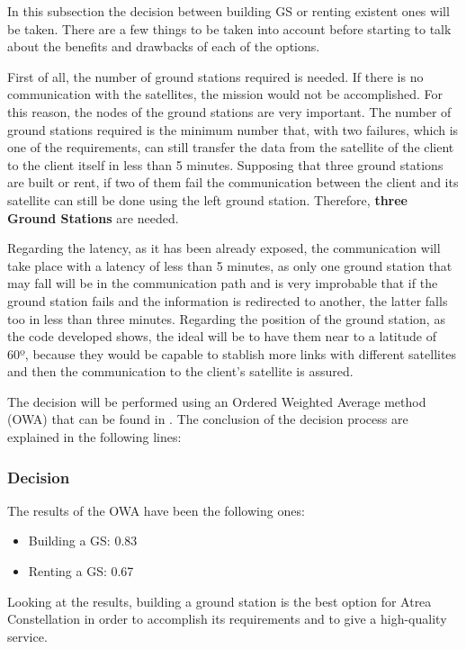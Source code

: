 In this subsection the decision between building GS or renting existent ones will be taken. There are a few things to be taken into account before starting to talk about the benefits and drawbacks of each of the options.

First of all, the number of ground stations required is needed. If there is no communication with the satellites, the mission would not be accomplished. For this reason, the nodes of the ground stations are very important. The number of ground stations required is the minimum number that, with two failures, which is one of the requirements, can still transfer the data from the satellite of the client to the client itself in less than 5 minutes. Supposing that three ground stations are built or rent, if two of them fail the communication between the client and its satellite can still be done using the left ground station. Therefore, \textbf{three Ground Stations} are needed.

Regarding the latency, as it has been already exposed, the communication will take place with a latency of less than 5 minutes, as only one ground station that may fall will be in the communication path and is very improbable that if the ground station fails and the information is redirected to another, the latter falls too in less than three minutes. Regarding the position of the ground station, as the code developed shows, the ideal will be to have them near to a latitude of 60º, because they would be capable to stablish more links with different satellites and then the communication to the client's satellite is assured.

The decision will be performed using an Ordered Weighted Average method (OWA) that can be found in \cite[Chapter 3, Section 5]{annex3}. The conclusion of the decision process are explained in the following lines:

\subsubsection{Decision}
The results of the OWA have been the following ones:
\begin{itemize}
\item Building a GS: 0.83
\item Renting a GS: 0.67
\end{itemize}

Looking at the results, building a ground station is the best option for Atrea Constellation in order to accomplish its requirements and to give a high-quality service.